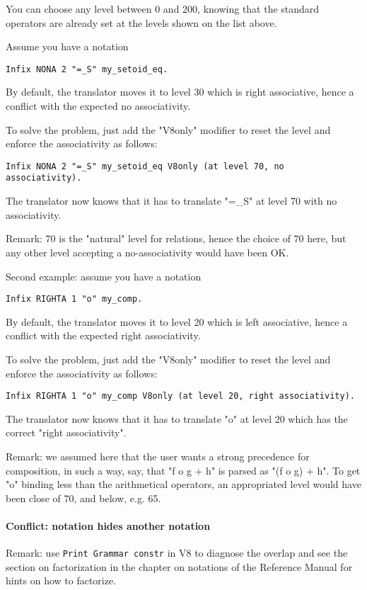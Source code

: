 \documentclass[11pt,a4paper]{article}
\begin{document}
  You can choose any level between 0 and 200, knowing that the
standard operators are already set at the levels shown on the list
above. 

Assume you have a notation
\begin{verbatim}
Infix NONA 2 "=_S" my_setoid_eq.
\end{verbatim}
By default, the translator moves it to level 30 which is right
associative, hence a conflict with the expected no associativity.

To solve the problem, just add the "V8only" modifier to reset the
level and enforce the associativity as follows:
\begin{verbatim}
Infix NONA 2 "=_S" my_setoid_eq V8only (at level 70, no associativity).
\end{verbatim}
The translator now knows that it has to translate "=_S" at level 70
with no associativity.

Remark: 70 is the "natural" level for relations, hence the choice of 70
here, but any other level accepting a no-associativity would have been
OK.

Second example: assume you have a notation
\begin{verbatim}
Infix RIGHTA 1 "o" my_comp.
\end{verbatim}
By default, the translator moves it to level 20 which is left
associative, hence a conflict with the expected right associativity.

To solve the problem, just add the "V8only" modifier to reset the
level and enforce the associativity as follows:
\begin{verbatim}
Infix RIGHTA 1 "o" my_comp V8only (at level 20, right associativity).
\end{verbatim}
The translator now knows that it has to translate "o" at level 20
which has the correct "right associativity".

Remark: we assumed here that the user wants a strong precedence for
composition, in such a way, say, that "f o g + h" is parsed as
"(f o g) + h". To get "o" binding less than the arithmetical operators,
an appropriated level would have been close of 70, and below, e.g. 65.


\paragraph{Conflict: notation hides another notation}

Remark: use {\tt Print Grammar constr} in V8 to diagnose the overlap
and see the section on factorization in the chapter on notations of
the Reference Manual for hints on how to factorize.
\end{document}
